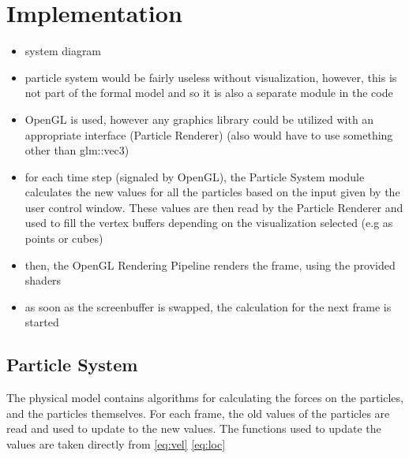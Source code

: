 \documentclass[runningheads,a4paper]{llncs}
\begin{document}
\section{Implementation}

\begin{itemize}
\item system diagram
\item particle system would be fairly useless without visualization, however, this is not part of the formal model and so it is also a separate module in the code
\item OpenGL is used, however any graphics library could be utilized with an appropriate interface (Particle Renderer) (also would have to use something other than glm::vec3)
\item for each time step (signaled by OpenGL), the Particle System module calculates the new values for all the particles based on the input given by the user control window. These values are then read by the Particle Renderer and used to fill the vertex buffers depending on the visualization selected (e.g as points or cubes)
\item then, the OpenGL Rendering Pipeline renders the frame, using the provided shaders
\item as soon as the screenbuffer is swapped, the calculation for the next frame is started
\end{itemize}

\subsection{Particle System}
The physical model contains algorithms for calculating the forces on the particles, and the particles themselves. For each frame, the old values of the particles are read and used to update to the new values. The functions used to update the values are taken directly from \ref{eq:vel} \ref{eq:loc}
\end{document}
